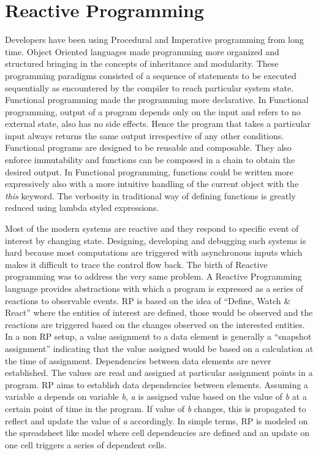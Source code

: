 \section {Reactive Programming}
Developers have been using Procedural and Imperative programming from long time. 
Object Oriented languages made programming more organized and structured bringing in the concepts of inheritance and modularity. 
These programming paradigms consisted of a sequence of statements to be executed sequentially as encountered by the compiler to reach particular system state. 
Functional programming made the programming more declarative. 
In Functional programming, output of a program depends only on the input and refers to no external state, also has no side effects\cite{Gifford:1986:IFI:319838.319848}. 
Hence the program that takes a particular input always returns the same output irrespective of any other conditions.
Functional programs are designed to be reusable and composable. 
They also enforce immutability and functions can be composed in a chain to obtain the desired output. 
In Functional programming, functions could be written more expressively also with a more intuitive handling of the current object with the \textit{this} keyword. 
The verbosity in traditional way of defining functions is greatly reduced using lambda styled expressions.

Most of the modern systems are reactive and they respond to specific event of interest by changing state. 
Designing, developing and debugging such systems is hard because most computations are triggered with asynchronous inputs which makes it difficult to trace the control flow back\cite{Margara:2014:WDD:2611286.2611290}. 
The birth of Reactive programming was to address the very same problem. A Reactive Programming language provides abstractions with which a program is expressed as a series of reactions to observable events\cite{Bainomugisha:2013:SRP:2501654.2501666}. 
RP is based on the idea of ``Define, Watch \& React''\cite{RPvsFP} where the entities of interest are defined, those would be observed and the reactions are triggered based on the changes observed on the interested entities. 
In a non RP setup, a value assignment to a data element is generally a ``snapshot assignment'' indicating that the value assigned would be based on a calculation at the time of assignment. 
Dependencies between data elements are never established. The values are read and assigned at particular assignment points in a program. 
RP aims to establish data dependencies between elements. 
Assuming a variable \textit{a} depends on variable \textit{b}, \textit{a} is assigned value based on the value of \textit{b} at a certain point of time in the program. 
If value of \textit{b} changes, this is propagated to reflect and update the value of \textit{a} accordingly. 
In simple terms, RP is modeled on the spreadsheet like model where  cell dependencies are defined and an update on one cell triggers a series of dependent cells\cite{Bainomugisha:2013:SRP:2501654.2501666}.

